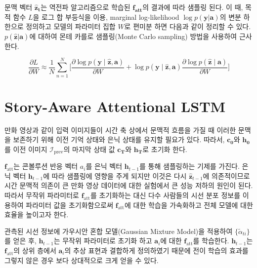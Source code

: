 \documentclass{kcc}
\newcommand{\vy}[0]{\mathbf{y}}
\newcommand{\va}[0]{\mathbf{a}}
\newcommand{\vh}[0]{\mathbf{h}}
\newcommand{\vz}[0]{\mathbf{z}}
\newcommand{\sa}[0]{\mathbf{a}}
\newcommand{\ff}[0]{\mathbf{f}}
\begin{document}
문맥 벡터 $\mathbf{\hat{z}_t}$는 역전파 알고리즘으로 학습된 $\mathbf{f_{\text{att}}}$의 결과에 따라 샘플링 된다. 이 때, 목적 함수 $\mathit{L}$을 로그 합 부등식을 이용, marginal log-likelihood $\log p(\mathbf{y}|\mathbf{a})$의 변분 하한으로 정의하고 모델의 파라미터 집합 $W$로 편미분 하면 다음과 같이 정리할 수 있다\cite{Xu2015}. $p(\hat{\vz}|\sa)$에 대하여 몬테 카를로 샘플링(Monte Carlo sampling) 방법을 사용하여 근사한다.

\begin{equation} 
 \frac{\partial L}{\partial W} \approx \frac{1}{N} \sum_{n=1}^{N} \bigg[ \frac{\partial \log p(\vy \mid \hat{\vz}, \va)}{\partial W} + 
                                \log p(\vy \mid \hat{\vz}, \va) \frac{\partial \log p(\hat{\vz} \mid \va)}{\partial W} \bigg]
\end{equation} 

\section{Story-Aware Attentional LSTM}

만화 영상과 같이 입력 이미지들이 시간 축 상에서 문맥적 흐름을 가질 때 이러한 문맥을 보존하기 위해 이전 기억 상태와 은닉 상태를 유지할 필요가 있다. 따라서, $\mathbf{c_0}$와 $\mathbf{h_0}$를 이전 이미지 $\mathcal{I}_{\text{prev}}$의 마지막 상태 값 $\mathbf{c_T}$와 $\mathbf{h_T}$로 초기화 한다.

$\ff_{\text{att}}$는 콘볼루션 반응 벡터 $a_i$를 은닉 벡터 $\vh_{t-1}$를 통해 샘플링하는 기제를 가진다. 은닉 벡터 $\vh_{t-1}$에 따라 샘플링에 영향을 주게 되지만 이것은 다시 $\hat{\vz}_{t-1}$에 의존적이므로 시간 문맥적 의존이 큰 만화 영상 데이터에 대한 실험에서 큰 성능 저하의 원인이 된다. 따라서 무작위 파라미터로 $\ff_{\text{att}}$를 초기화하는 대신 다수 사람들의 시선 분포 정보를 이용하여 파라미터 값을 초기화함으로써 $\ff_{\text{att}}$에 대한 학습을 가속화하고 전체 모델에 대한 효율을 높이고자 한다.

관측된 시선 정보에 가우시안 혼합 모델(Gaussian Mixture Model)을 적용하여 $\{\tilde{\alpha}_{ti}\}$를 얻은 후, $\vh_{t-1}$는 무작위 파라미터로 초기화 하고 $\sa_i$에 대한 $\ff_{\text{att}}$를 학습한다. $\vh_{t-1}$는 $\ff_{\text{att}}$의 상위 층에서 $\sa_i$의 추상 표현과 결합하게 정의하였기 때문에 전이 학습의 효과를 그렇지 않은 경우 보다 상대적으로 크게 얻을 수 있다\cite{yosinski2014}. 
\end{document}

